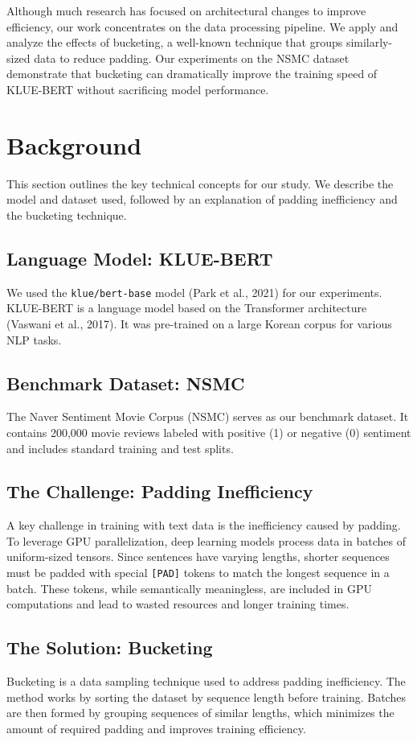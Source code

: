 \documentclass{article}
\begin{document}
Although much research has focused on architectural changes to improve efficiency, our work concentrates on the data processing pipeline. We apply and analyze the effects of bucketing, a well-known technique that groups similarly-sized data to reduce padding. Our experiments on the NSMC dataset demonstrate that bucketing can dramatically improve the training speed of KLUE-BERT without sacrificing model performance.

\section{Background}

This section outlines the key technical concepts for our study. We describe the model and dataset used, followed by an explanation of padding inefficiency and the bucketing technique.

\subsection{Language Model: KLUE-BERT}
We used the \texttt{klue/bert-base} model (Park et al., 2021) for our experiments. KLUE-BERT is a language model based on the Transformer architecture (Vaswani et al., 2017). It was pre-trained on a large Korean corpus for various NLP tasks.

\subsection{Benchmark Dataset: NSMC}
The Naver Sentiment Movie Corpus (NSMC) serves as our benchmark dataset. It contains 200,000 movie reviews labeled with positive (1) or negative (0) sentiment and includes standard training and test splits.

\subsection{The Challenge: Padding Inefficiency}
A key challenge in training with text data is the inefficiency caused by padding. To leverage GPU parallelization, deep learning models process data in batches of uniform-sized tensors. Since sentences have varying lengths, shorter sequences must be padded with special \texttt{[PAD]} tokens to match the longest sequence in a batch. These tokens, while semantically meaningless, are included in GPU computations and lead to wasted resources and longer training times.

\subsection{The Solution: Bucketing}
Bucketing is a data sampling technique used to address padding inefficiency. The method works by sorting the dataset by sequence length before training. Batches are then formed by grouping sequences of similar lengths, which minimizes the amount of required padding and improves training efficiency.
\end{document}
